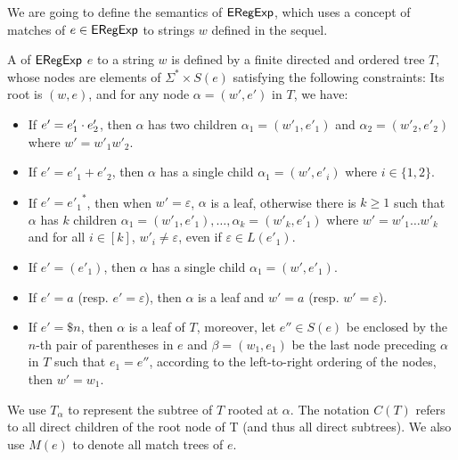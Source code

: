 We are going to define the semantics of ${\sf ERegExp}$, which uses a concept of matches of $e \in {\sf ERegExp}$ to strings $w$ defined in the sequel.
  
  \begin{definition}
  	A  of ${\sf ERegExp}$ $e$ to a string $w$ is defined by a finite directed and ordered
  	tree $T$, whose nodes are elements of $\Sigma^{\ast} \times S (e)$ satisfying the following constraints: Its root is $(w, e)$, and for any node $\alpha =
  	(w', e')$ in $T$, we have:
  	\begin{itemize}
  		\item If $e' = e'_1 \cdot e'_2$, then $\alpha$ has two children $\alpha_1 = (w'_1,
  		e'_1)$ and $\alpha_2=(w'_2, e'_2)$ where $w' = w'_1 w'_2$.
  		
  		\item If $e' = e'_1 + e'_2$, then $\alpha$ has a single child $\alpha_1 = (w',
  		e'_i)$ where $i \in \{ 1, 2 \}$.
  		
  		\item If $e' = {e'_1}^{\ast}$, then when $w' = \varepsilon$, $\alpha$ is a
  		leaf, otherwise there is $k \geqslant 1$ such that $\alpha$ has $k$ children $\alpha_1 = (w'_1,
  		e'_1), \ldots, \alpha_k = (w'_k, e'_1)$ where $w' = w'_1 \ldots w'_k$ and for all
  		$i \in [k]$, $w'_i \neq \varepsilon$, even if $\varepsilon \in L
  		(e'_1)$.
  		
  		\item If $e' = (e'_1)$, then $\alpha$ has a single child $\alpha_1 = (w', e'_1)$.
  		
  		\item If $e' = a$ (resp. $e' = \varepsilon$), then $\alpha$ is a leaf and
  		$w' = a$ (resp. $w' = \varepsilon$).
		
		\item If $e' = \$n$, then $\alpha$ is a leaf of $T$, moreover, let $e'' \in S(e)$ be enclosed by the $n$-th pair of parentheses in $e$ and $\beta = (w_1, e_1)$ be the last node preceding $\alpha$ in $T$ such that $e_1 = e''$, according to the left-to-right ordering of the nodes, then $w' = w_1$.
  	\end{itemize}
  	
 We use $T_\alpha$ to represent the subtree of $T$ rooted at $\alpha$. 
	The notation $C(T)$ refers to all direct children of the root node of T
  	(and thus all direct subtrees).
  	We also use $M (e)$ to denote all match trees of $e$.
  \end{definition}
  
